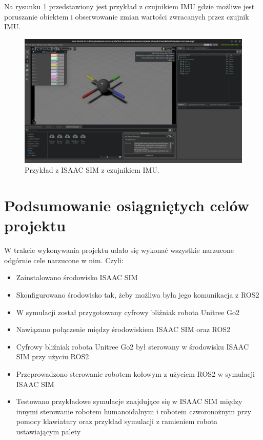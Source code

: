 \documentclass[12pt]{article}
\begin{document}
Na rysunku \ref{IMU} przedstawiony jest przykład z czujnikiem IMU gdzie możliwe jest poruszanie obiektem i obserwowanie zmian wartości zwracanych przez czujnik IMU.

\begin{figure}[h]
    \centering
    \includegraphics[width=0.7\linewidth]{Zdjęcia/czujnikIMU.png}
    \caption{Przykład z ISAAC SIM z czujnikiem IMU.}
    \label{IMU}
\end{figure}

\clearpage

\section{Podsumowanie osiągniętych celów projektu}

W trakcie wykonywania projektu udało się wykonać wszystkie narzucone odgórnie cele narzucone w nim. Czyli:
\begin{itemize}
    \item Zainstalowano środowisko ISAAC SIM
    \item Skonfigurowano środowisko tak, żeby możliwa była jego komunikacja z ROS2
    \item W symulacji został przygotowany cyfrowy bliźniak robota Unitree Go2
    \item Nawiązano połączenie między środowiskiem ISAAC SIM oraz ROS2
    \item Cyfrowy bliźniak robota Unitree Go2 był sterowany w środowisku ISAAC SIM przy użyciu ROS2
    \item Przeprowadzono sterowanie robotem kołowym z użyciem ROS2 w symulacji ISAAC SIM
    \item Testowano przykładowe symulacje znajdujące się w ISAAC SIM między innymi sterowanie robotem humanoidalnym i robotem czworonożnym przy pomocy klawiatury oraz przykład symulacji z ramieniem robota ustawiającym palety 
    
\end{itemize}
\end{document}
